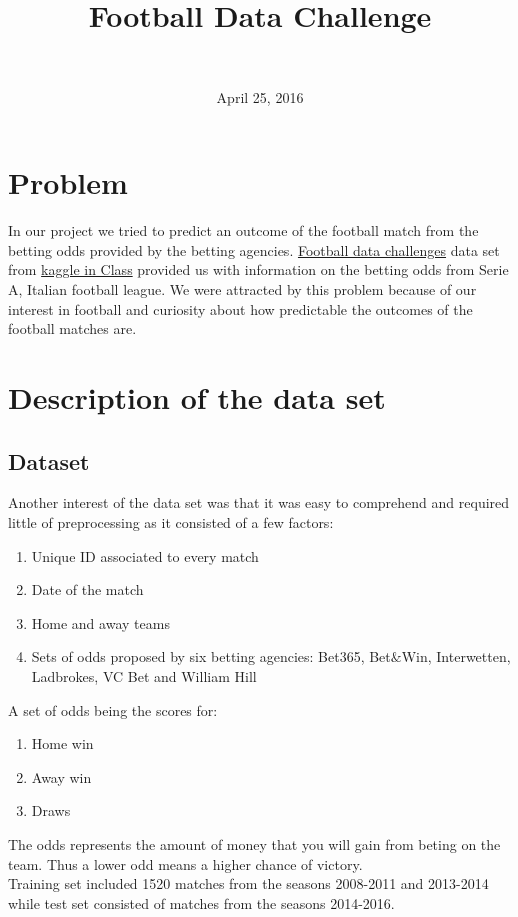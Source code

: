 \documentclass[11pt]{article}
\title{Football Data Challenge}
\author{\text{\small{prepared by} \large{Dimitri Lajou, Pijus Simonaitis}} \\ \text{\large{ENS Lyon, DBDM M1}}}
\date{April 25, 2016}
\begin{document}
\maketitle

\section{Problem}

In our project we tried to predict an outcome of the football match from the betting odds provided by the betting agencies. \href{https://inclass.kaggle.com/c/football-data-challenge/}{Football data challenges} data set from \href{https://inclass.kaggle.com/}{kaggle in Class} provided us with information on the betting odds from Serie A, Italian football league. We were attracted by this problem because of our interest in football and curiosity about how predictable the outcomes of the football matches are.
\section{Description of the data set}

\subsection{Dataset}

Another interest of the data set was that it was easy to comprehend and required little of preprocessing as it consisted of a few factors:
\begin{enumerate}
		\item Unique ID associated to every match
		\item Date of the match
		\item Home and away teams
		\item Sets of odds proposed by six betting agencies: Bet365, Bet$\&$Win, Interwetten, Ladbrokes, VC Bet and William Hill 
\end{enumerate}

A set of odds being the scores for:

\begin{enumerate}
		\item Home win
		\item Away win
		\item Draws 
\end{enumerate}

The odds represents the amount of money that you will gain from beting on the team. Thus a lower odd means a higher chance of victory.\\
Training set included 1520 matches from the seasons 2008-2011 and 2013-2014 while test set consisted of matches from the seasons 2014-2016. 
\end{document}
